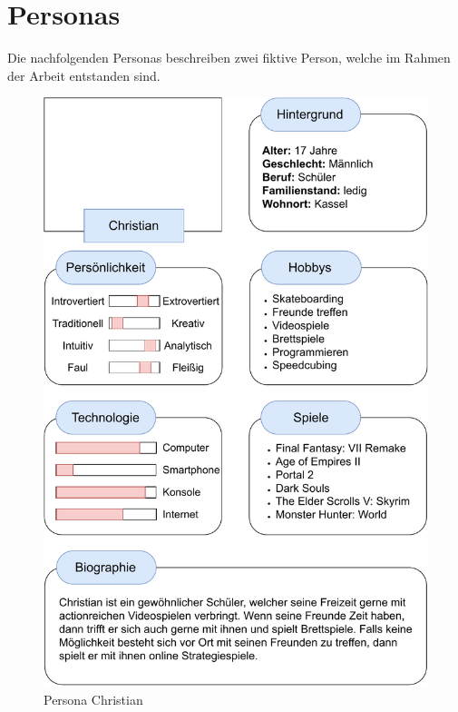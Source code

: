 \section{Personas}
Die nachfolgenden Personas beschreiben zwei fiktive Person, welche im Rahmen der Arbeit entstanden sind.

\begin{figure}[H]
\centering
\includegraphics[width=0.83\columnwidth]{figures/Persona1.pdf}
  \caption{\label{fig:Persona1} Persona Christian}
\end{figure}


